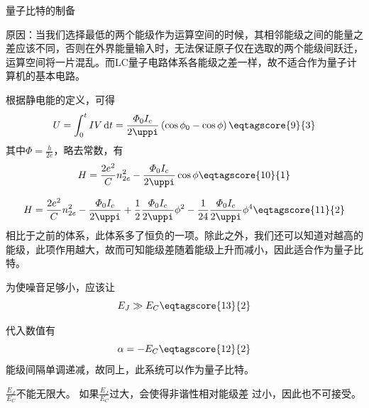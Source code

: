 \documentclass[answer]{cphos}
\begin{document}
\begin{problem}[50]{量子比特的制备}
\begin{solution}
原因：当我们选择最低的两个能级作为运算空间的时候，其相邻能级之间的能量之差应该不同，否则在外界能量输入时，无法保证原子仅在选取的两个能级间跃迁，运算空间将一片混乱。而LC量子电路体系各能级之差一样，故不适合作为量子计算机的基本电路。

根据静电能的定义，可得
\begin{equation}
    U=\int_{0}^{t} IV\,\mathrm{d}t=\frac{\varPhi_0I_c}{2\uppi}\left(\cos\phi_0-\cos\phi\right) \eqtagscore{9}{3}
\end{equation}
其中$\varPhi=\frac{h}{2e}$，略去常数，有
\begin{equation}
    H=\frac{2e^2}{C}n_{2e}^2-\frac{\varPhi_0I_c}{2\uppi}\cos\phi \eqtagscore{10}{1}
\end{equation}

\begin{equation}
    H=\frac{2e^2}{C}n_{2e}^2-\frac{\varPhi_0I_c}{2\uppi}+\frac{1}{2}\frac{\varPhi_0I_c}{2\uppi}\phi^2-\frac{1}{24}\frac{\varPhi_0I_c}{2\uppi}\phi^4 \eqtagscore{11}{2}
\end{equation}
相比于之前的体系，此体系多了恒负的一项。除此之外，我们还可以知道对越高的能级，此项作用越大，故而可知能级差随着能级上升而减小，因此适合作为量子比特。

为使噪音足够小，应该让
\begin{equation}
	E_J\gg E_C \eqtagscore{13}{2}
\end{equation}

代入数值有
\begin{equation}
    \alpha=-E_C\eqtagscore{12}{2}
\end{equation}
能级间隔单调递减，故同上，此系统可以作为量子比特。

$\frac{E_J}{E_C}$不能无限大。
如果$\frac{E_J}{E_C}$过大，会使得非谐性相对能级差
过小，因此也不可接受。


\end{solution}
\end{problem}
\end{document}
